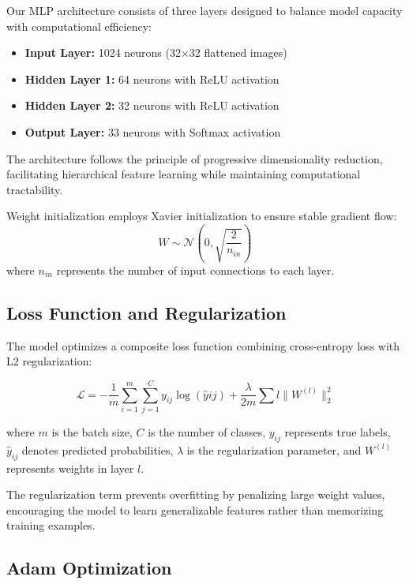 \documentclass[12pt,a4paper]{article}
\begin{document}
	Our MLP architecture consists of three layers designed to balance model capacity with computational efficiency:
	
	\begin{itemize}
		\item \textbf{Input Layer:} 1024 neurons (32×32 flattened images)
		\item \textbf{Hidden Layer 1:} 64 neurons with ReLU activation
		\item \textbf{Hidden Layer 2:} 32 neurons with ReLU activation  
		\item \textbf{Output Layer:} 33 neurons with Softmax activation
	\end{itemize}
	
	The architecture follows the principle of progressive dimensionality reduction, facilitating hierarchical feature learning while maintaining computational tractability.
	
	Weight initialization employs Xavier initialization to ensure stable gradient flow:
	\begin{equation}
		W \sim \mathcal{N}\left(0, \sqrt{\frac{2}{n_{in}}}\right)
	\end{equation}
	where $n_{in}$ represents the number of input connections to each layer.
	
	\subsection{Loss Function and Regularization}
	
	The model optimizes a composite loss function combining cross-entropy loss with L2 regularization:
	
	\begin{equation}
		\mathcal{L} = -\frac{1}{m}\sum_{i=1}^{m}\sum_{j=1}^{C} y_{ij} \log(\hat{y}{ij}) + \frac{\lambda}{2m}\sum{l}\|W^{(l)}\|_2^2
	\end{equation}
	
	where $m$ is the batch size, $C$ is the number of classes, $y_{ij}$ represents true labels, $\hat{y}_{ij}$ denotes predicted probabilities, $\lambda$ is the regularization parameter, and $W^{(l)}$ represents weights in layer $l$.
	
	The regularization term prevents overfitting by penalizing large weight values, encouraging the model to learn generalizable features rather than memorizing training examples.
	
	\subsection{Adam Optimization}
	
\end{document}
